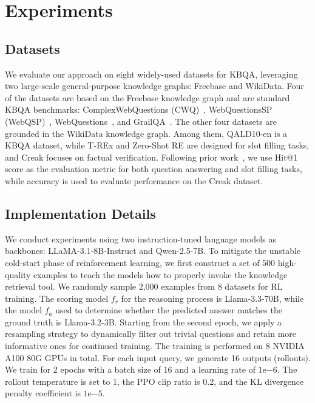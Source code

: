 \documentclass[10pt,conference]{IEEEtran}
\begin{document}
\section{Experiments}
\subsection{Datasets}
\label{sec:datasets-experimens}
We evaluate our approach on eight widely-used datasets for KBQA, leveraging two large-scale general-purpose knowledge graphs: Freebase and WikiData. Four of the datasets are based on the Freebase knowledge graph and are standard KBQA benchmarks: ComplexWebQuestions (CWQ)~\cite{talmor2018web}, WebQuestionsSP (WebQSP)~\cite{yih2016value}, WebQuestions~\cite{berant2013semantic}, and GrailQA~\cite{gu2021beyond}. The other four datasets are grounded in the WikiData knowledge graph. Among them, QALD10-en \cite{perevalov2022qald} is a KBQA dataset, while T-REx \cite{elsahar2018t} and Zero-Shot RE \cite{petroni2021kilt} are designed for slot filling tasks, and Creak \cite{onoe2creak} focuses on factual verification. 
Following prior work~\cite{sun2024thinkongraph, zhao2024kg, xiong-etal-2024-interactive}, we use Hit@1 score as the evaluation metric for both question answering and slot filling tasks, while accuracy is used to evaluate performance on the Creak dataset. 

\subsection{Implementation Details}
We conduct experiments using two instruction-tuned language models as backbones: LLaMA-3.1-8B-Instruct and Qwen-2.5-7B. To mitigate the unstable cold-start phase of reinforcement learning, we first construct a set of 500 high-quality examples to teach the models how to properly invoke the knowledge retrieval tool. We randomly sample 2,000 examples from 8 datasets for RL training. The scoring model $f_r$ for the reasoning process is Llama-3.3-70B, while the model $f_a$ used to determine whether the predicted answer matches the ground truth is Llama-3.2-3B.
Starting from the second epoch, we apply a resampling strategy to dynamically filter out trivial questions and retain more informative ones for continued training.
The training is performed on 8 NVIDIA A100 80G GPUs in total. For each input query, we generate 16 outputs (rollouts). We train for 2 epochs with a batch size of 16 and a learning rate of $1\text{e}{-6}$. The rollout temperature is set to 1, the PPO clip ratio is 0.2, and the KL divergence penalty coefficient is $1\text{e}{-5}$.
\end{document}
